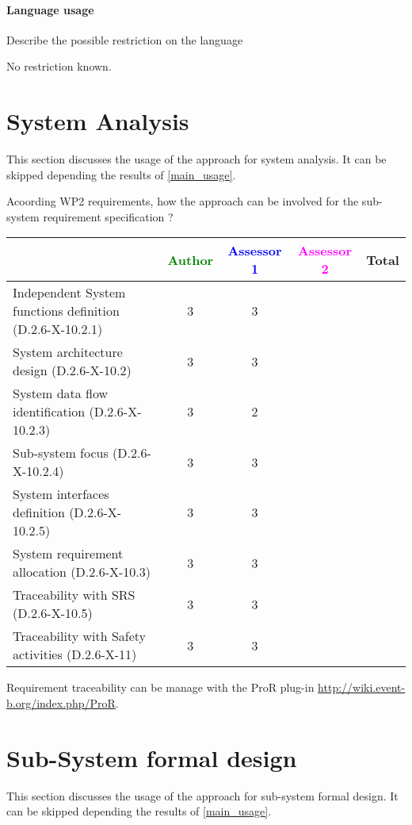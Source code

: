 \paragraph{Language usage} Describe the possible restriction on the language

\begin{author_comment}
No restriction known.
\end{author_comment}

\section{System Analysis}
This section discusses the usage of the approach for system analysis.
It can be skipped depending the results of \ref{main_usage}.

Acoording WP2 requirements, how the approach can be involved for the sub-system requirement specification ?

\begin{tabular}{|l | c | c | c | c|}
\hline
& \textcolor{green}{Author} & \textcolor{blue}{Assessor 1} & \textcolor{magenta}{Assessor 2} & Total \\
\hline
Independent System functions definition (D.2.6-X-10.2.1)  & 3 & 3 & &  \\
\hline 
System architecture design (D.2.6-X-10.2) & 3 & 3 & &  \\
\hline
System data flow identification (D.2.6-X-10.2.3)  & 3 & 2 & &  \\
\hline
Sub-system focus (D.2.6-X-10.2.4)  & 3 & 3 & &  \\
\hline
System interfaces definition (D.2.6-X-10.2.5)  & 3 & 3 & &  \\
\hline
System requirement allocation (D.2.6-X-10.3)  & 3 & 3 & &  \\
\hline
Traceability with SRS (D.2.6-X-10.5)  & 3 & 3 & &  \\
\hline
Traceability with Safety activities (D.2.6-X-11)  & 3 & 3 & &  \\
\hline
\end{tabular}

\begin{author_comment}
Requirement traceability can be manage with the ProR plug-in \url{http://wiki.event-b.org/index.php/ProR}.
\end{author_comment}

\section{Sub-System formal design}
This section discusses the usage of the approach for sub-system formal design.
It can be skipped depending the results of \ref{main_usage}.

